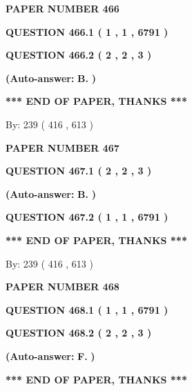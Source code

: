 \documentclass[12pt]{article}
\begin{document}
   
 {\textbf{ \Large{ PAPER NUMBER  466  }}}
   
   
   
   
  
  
{\textbf{\large{QUESTION
466.1 
 ( 1 , 1 , 6791 )
}}}
  
  
{\textbf{\large{QUESTION
466.2 
 ( 2 , 2 , 3 )
}}}
 
 
{\textbf{(Auto-answer:}}
{\textbf{\large{
B.}}}
{\textbf{)}}
 
 
   
   
   
   
\vspace{1.0in} 
{\textbf{\large{ *** END OF PAPER, THANKS *** }}} 
   
   
\hspace{1.0in} By: 
 239 ( 416 ,  613 )
   
   
   
   
\newpage 
\setcounter{page}{ 
   467001 } 
   
   
 {\textbf{ \Large{ PAPER NUMBER  467  }}}
   
   
   
   
  
  
{\textbf{\large{QUESTION
467.1 
 ( 2 , 2 , 3 )
}}}
 
 
{\textbf{(Auto-answer:}}
{\textbf{\large{
B.}}}
{\textbf{)}}
 
 
  
  
{\textbf{\large{QUESTION
467.2 
 ( 1 , 1 , 6791 )
}}}
   
   
   
   
\vspace{1.0in} 
{\textbf{\large{ *** END OF PAPER, THANKS *** }}} 
   
   
\hspace{1.0in} By: 
 239 ( 416 ,  613 )
   
   
   
   
\newpage 
\setcounter{page}{ 
   468001 } 
   
   
 {\textbf{ \Large{ PAPER NUMBER  468  }}}
   
   
   
   
  
  
{\textbf{\large{QUESTION
468.1 
 ( 1 , 1 , 6791 )
}}}
  
  
{\textbf{\large{QUESTION
468.2 
 ( 2 , 2 , 3 )
}}}
 
 
{\textbf{(Auto-answer:}}
{\textbf{\large{
F.}}}
{\textbf{)}}
 
 
   
   
   
   
\vspace{1.0in} 
{\textbf{\large{ *** END OF PAPER, THANKS *** }}} 
   
\end{document}
